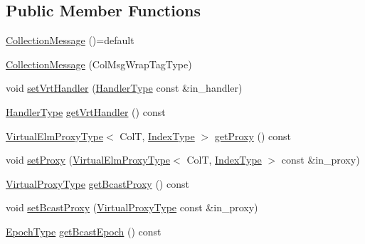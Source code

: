 \subsection*{Public Member Functions}
\begin{DoxyCompactItemize}
\item 
\hyperlink{structvt_1_1vrt_1_1collection_1_1_collection_message_a67157cfe91f1138728cf8c4ea14a0778}{Collection\+Message} ()=default
\item 
\hyperlink{structvt_1_1vrt_1_1collection_1_1_collection_message_a8012bc5471893e2daedeab8aa4ed1509}{Collection\+Message} (Col\+Msg\+Wrap\+Tag\+Type)
\item 
void \hyperlink{structvt_1_1vrt_1_1collection_1_1_collection_message_aa6986dc4ba8ac540311a882bef86e80c}{set\+Vrt\+Handler} (\hyperlink{namespacevt_af64846b57dfcaf104da3ef6967917573}{Handler\+Type} const \&in\+\_\+handler)
\item 
\hyperlink{namespacevt_af64846b57dfcaf104da3ef6967917573}{Handler\+Type} \hyperlink{structvt_1_1vrt_1_1collection_1_1_collection_message_aa5966355f4fe5f9ac7dc965a7f6e4de4}{get\+Vrt\+Handler} () const
\item 
\hyperlink{namespacevt_1_1vrt_a620a5c8c59d13e513f690c74b4af516f}{Virtual\+Elm\+Proxy\+Type}$<$ ColT, \hyperlink{structvt_1_1vrt_1_1collection_1_1_collection_message_a324978c38e67d1bfa86c8db172e77594}{Index\+Type} $>$ \hyperlink{structvt_1_1vrt_1_1collection_1_1_collection_message_a195386067f31cffdecbce5f05bfba5f2}{get\+Proxy} () const
\item 
void \hyperlink{structvt_1_1vrt_1_1collection_1_1_collection_message_a38349a148d8dbcab2a4a54efa2089e1c}{set\+Proxy} (\hyperlink{namespacevt_1_1vrt_a620a5c8c59d13e513f690c74b4af516f}{Virtual\+Elm\+Proxy\+Type}$<$ ColT, \hyperlink{structvt_1_1vrt_1_1collection_1_1_collection_message_a324978c38e67d1bfa86c8db172e77594}{Index\+Type} $>$ const \&in\+\_\+proxy)
\item 
\hyperlink{namespacevt_a1b417dd5d684f045bb58a0ede70045ac}{Virtual\+Proxy\+Type} \hyperlink{structvt_1_1vrt_1_1collection_1_1_collection_message_a25c1d0924ade6a7e074fc419a75c8a71}{get\+Bcast\+Proxy} () const
\item 
void \hyperlink{structvt_1_1vrt_1_1collection_1_1_collection_message_a0f4be7193beb77e9862417a5eb6cff5a}{set\+Bcast\+Proxy} (\hyperlink{namespacevt_a1b417dd5d684f045bb58a0ede70045ac}{Virtual\+Proxy\+Type} const \&in\+\_\+proxy)
\item 
\hyperlink{namespacevt_a985a5adf291c34a3ca263b3378388236}{Epoch\+Type} \hyperlink{structvt_1_1vrt_1_1collection_1_1_collection_message_a81604b8f38e3ee3eea6caf6a1012175c}{get\+Bcast\+Epoch} () const

\end{DoxyCompactItemize}
